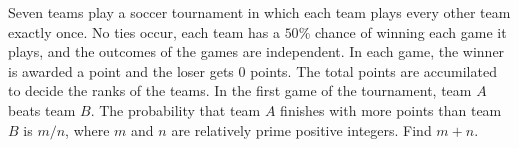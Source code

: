 Seven teams play a soccer tournament in which each team plays every other team exactly once. No ties occur, each team has a $50\%$ chance of winning each game it plays, and the outcomes of the games are independent. In each game, the winner is awarded a point and the loser gets 0 points. The total points are accumilated to decide the ranks of the teams. In the first game of the tournament, team $A$ beats team $B$. The probability that team $A$ finishes with more points than team $B$ is $m/n$, where $m$ and $n$ are relatively prime positive integers. Find $m+n$.
